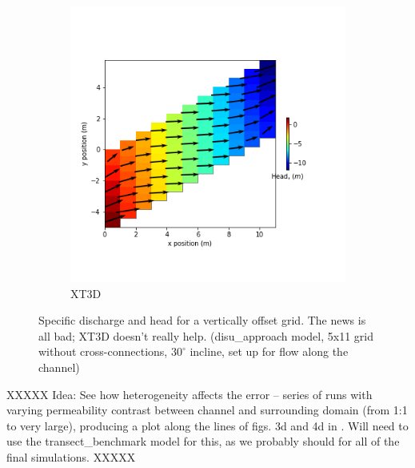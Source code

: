 \documentclass{article}
\begin{document}
\begin{figure}[H]
\begin{subfigure}{0.4\textwidth}
	\includegraphics[width=\textwidth]{../figures/disu-x-nocc-head.png}
	\caption{XT3D}
	\label{fig:disu-x-nocc-head}
\end{subfigure}
\caption{Specific discharge and head for a vertically offset grid. The news is all bad; XT3D doesn't really help. (disu\_approach model, 5x11 grid without cross-connections, $30^{\circ}$ incline, set up for flow along the channel)}
\label{fig:figures}
\end{figure}

XXXXX Idea: See how heterogeneity affects the error -- series of runs with varying permeability contrast between channel and surrounding domain (from 1:1 to very large), producing a plot along the lines of figs. 3d and 4d in \cite{bardot2022}. Will need to use the transect\_benchmark model for this, as we probably should for all of the final simulations. XXXXX
\end{document}
